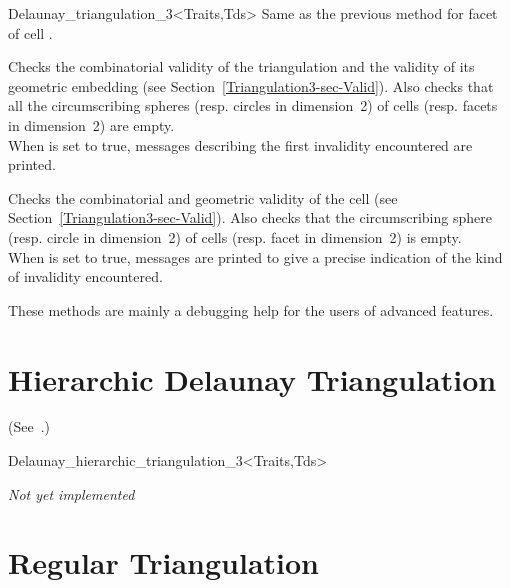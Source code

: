 \begin{ccClassTemplate}{Delaunay_triangulation_3<Traits,Tds>}
{Same as the previous method for facet  of cell .}

\begin{ccAdvanced}
{Checks the combinatorial validity of the triangulation and the
validity of its geometric embedding (see
Section~\ref{Triangulation3-sec-Valid}). Also checks that all the
circumscribing spheres (resp. circles in dimension~2) of  cells
(resp. facets in dimension~2) are empty.\\ When  is set to
true,  messages describing the first invalidity encountered are
printed.}

{Checks the combinatorial and geometric validity of the cell (see
Section~\ref{Triangulation3-sec-Valid}). Also checks that the
circumscribing sphere (resp. circle in dimension~2) of  cells
(resp. facet in dimension~2) is empty.\\
 When  is set to
true, messages are printed to give
a precise indication of the kind of invalidity encountered.}

These methods are  mainly a debugging help for the users of advanced features.
\end{ccAdvanced}

\end{ccClassTemplate}

\section{Hierarchic Delaunay Triangulation} 

(See~\cite{d-iirdt-98}.)

\begin{ccClassTemplate}{Delaunay_hierarchic_triangulation_3<Traits,Tds>}

\textit{Not yet implemented}

\end{ccClassTemplate}

\section{Regular Triangulation} 
\label{Triangulation3-sec-class-Regulartriangulation}

